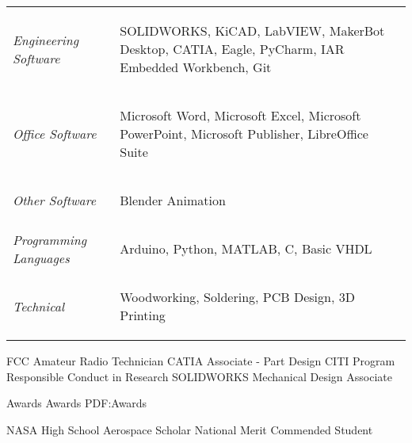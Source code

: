\documentclass[letterpaper,ddMMMyyyy,nonstopmode]{simpleresumecv}
\newcommand{\tableWidth}{23.5em}
\begin{document}
\begin{Body}
		
		
		
		\def\arraystretch{0}%
		\hspace*{-0.8em}
		\begin{tabular}[t]{p{5em} p{\tableWidth}}
			\textit{Engineering Software} &
			\begin{Detail}
				SOLIDWORKS, KiCAD, LabVIEW, MakerBot Desktop, CATIA, Eagle, PyCharm, IAR Embedded Workbench, Git
			\end{Detail}\\
			\textit{Office Software} &
			\begin{Detail}
				Microsoft Word, Microsoft Excel, Microsoft PowerPoint, Microsoft Publisher, LibreOffice Suite
			\end{Detail}\\
			\textit{Other Software}&
			\begin{Detail}
				Blender Animation\newline~\newline
			\end{Detail}\\
			\textit{Programming Languages} &
			\begin{Detail}
				Arduino, Python, MATLAB, C, Basic VHDL\newline~\newline
			\end{Detail}\\
			\textit{Technical}&
			\begin{Detail}
				Woodworking, Soldering, PCB Design, 3D Printing
			\end{Detail}		
		\end{tabular}
		
		
		
		\Entry FCC Amateur Radio Technician
		\Entry CATIA Associate - Part Design
		\Entry CITI Program Responsible Conduct in Research
		\Entry SOLIDWORKS Mechanical Design Associate
		
		
		\Section
		{Awards}
		{Awards}
		{PDF:Awards}
		
		\Entry NASA High School Aerospace Scholar
		\Entry National Merit Commended Student
	\end{Body}
	
\end{document}
